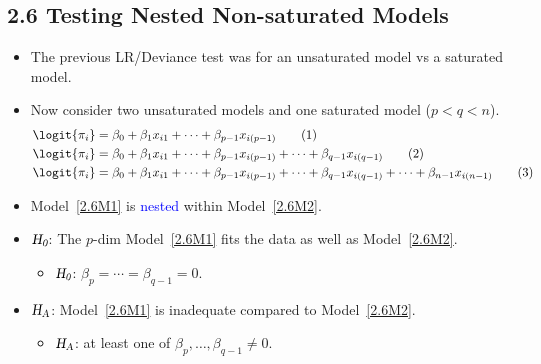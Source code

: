 \documentclass[oneside]{book}\usepackage[]{graphicx}\usepackage[svgnames]{xcolor}
\newcommand{\HN}{\textsl{H}_{\textsl{0}}}%
\newcommand{\HA}{\textsl{H}_{\textsl{A}}}%
\begin{document}
\subsection*{2.6 Testing Nested Non-saturated Models}
\begin{itemize}
      \item The previous LR/Deviance test was for an unsaturated model vs a saturated model.
      \item Now consider two unsaturated models and one saturated model ($ p<q<n $).
            \begin{align*}
                  \logit{\pi_i} & =\beta_0+\beta_1x_{i1}+\cdots+\beta_{p-1}x_{i(p-1)}\tag*{(1)}\label{2.6M1}                                                           \\
                  \logit{\pi_i} & =\beta_0+\beta_1x_{i1}+\cdots+\beta_{p-1}x_{i(p-1)}+\cdots+\beta_{q-1}x_{i(q-1)}\tag*{(2)}\label{2.6M2}                              \\
                  \logit{\pi_i} & =\beta_0+\beta_1x_{i1}+\cdots+\beta_{p-1}x_{i(p-1)}+\cdots+\beta_{q-1}x_{i(q-1)}+\cdots+\beta_{n-1}x_{i(n-1)}\tag*{(3)}\label{2.6M3}
            \end{align*}
      \item Model~\ref{2.6M1} is \textcolor{Blue}{nested} within Model~\ref{2.6M2}.
      \item $ \HN $: The $ p $-dim Model~\ref{2.6M1} fits the data as well as Model~\ref{2.6M2}.
            \begin{itemize}
                  \item $ \HN $: $ \beta_p=\cdots=\beta_{q-1}=0 $.
            \end{itemize}
      \item $ \HA $: Model~\ref{2.6M1} is inadequate compared to Model~\ref{2.6M2}.
            \begin{itemize}
                  \item $ \HA $: at least one of $ \beta_p,\ldots,\beta_{q-1}\ne 0 $.
            \end{itemize}
\end{itemize}
\end{document}
